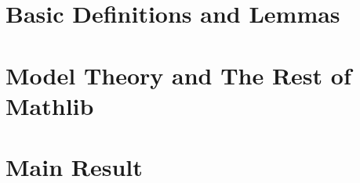 %

    

\chapter{Basic Definitions and Lemmas}



\chapter{Model Theory and The Rest of Mathlib}



\chapter{Main Result}

